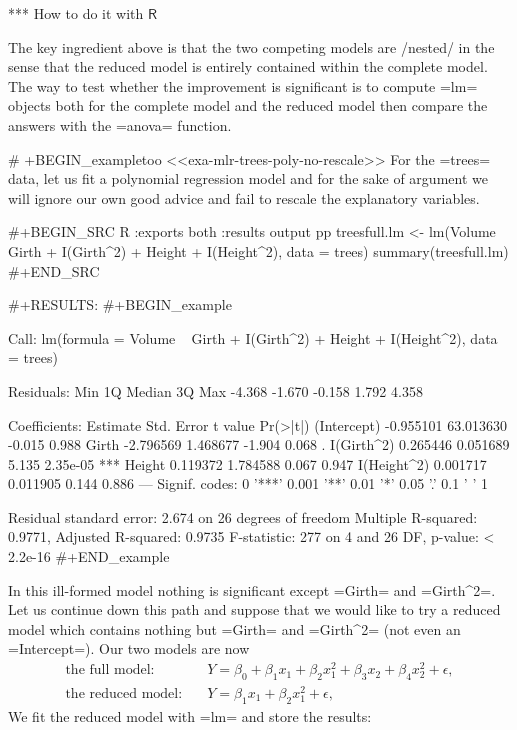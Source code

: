 *** How to do it with \(\mathsf{R}\)

The key ingredient above is that the two competing models are /nested/
in the sense that the reduced model is entirely contained within the
complete model. The way to test whether the improvement is significant
is to compute =lm= objects both for the complete model and the reduced
model then compare the answers with the =anova= function.

# +BEGIN_exampletoo
<<exa-mlr-trees-poly-no-rescale>> For the =trees= data, let us fit a
polynomial regression model and for the sake of argument we will
ignore our own good advice and fail to rescale the explanatory
variables.

#+BEGIN_SRC R :exports both :results output pp 
treesfull.lm <- lm(Volume ~ Girth + I(Girth^2) + Height + 
                   I(Height^2), data = trees)
summary(treesfull.lm)
#+END_SRC

#+RESULTS:
#+BEGIN_example

Call:
lm(formula = Volume ~ Girth + I(Girth^2) + Height + I(Height^2), 
    data = trees)

Residuals:
   Min     1Q Median     3Q    Max 
-4.368 -1.670 -0.158  1.792  4.358 

Coefficients:
             Estimate Std. Error t value Pr(>|t|)    
(Intercept) -0.955101  63.013630  -0.015    0.988    
Girth       -2.796569   1.468677  -1.904    0.068 .  
I(Girth^2)   0.265446   0.051689   5.135 2.35e-05 ***
Height       0.119372   1.784588   0.067    0.947    
I(Height^2)  0.001717   0.011905   0.144    0.886    
---
Signif. codes:  0 '***' 0.001 '**' 0.01 '*' 0.05 '.' 0.1 ' ' 1

Residual standard error: 2.674 on 26 degrees of freedom
Multiple R-squared:  0.9771,	Adjusted R-squared:  0.9735 
F-statistic:   277 on 4 and 26 DF,  p-value: < 2.2e-16
#+END_example

In this ill-formed model nothing is significant except =Girth= and
=Girth^2=. Let us continue down this path and suppose that we would
like to try a reduced model which contains nothing but =Girth= and
=Girth^2= (not even an =Intercept=). Our two models are now
\begin{align*} 
\mbox{the full model:} & \quad Y=\beta_{0}+\beta_{1}x_{1}+\beta_{2}x_{1}^{2}+\beta_{3}x_{2}+\beta_{4}x_{2}^{2}+\epsilon,\\
\mbox{the reduced model:} & \quad Y=\beta_{1}x_{1}+\beta_{2}x_{1}^{2}+\epsilon,
\end{align*}
We fit the reduced model with =lm= and store the results:

